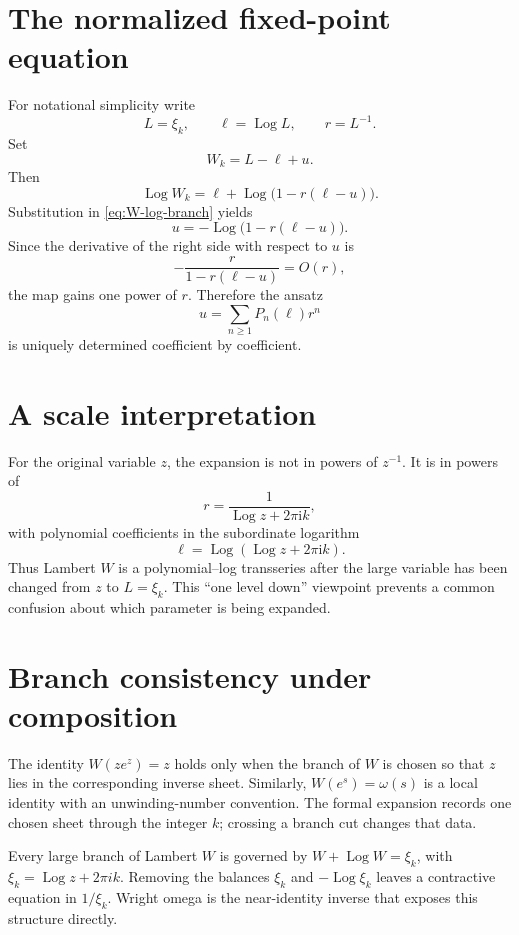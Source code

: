 \documentclass[11pt,openany]{book}
\theoremstyle{definition}
\theoremstyle{plain}
\theoremstyle{remark}
\newcommand{\ii}{\mathrm{i}}
\DeclareMathOperator{\Log}{Log}
\begin{document}
\section{The normalized fixed-point equation}
For notational simplicity write
\[
 L=\xi_k,
 \qquad \ell=\Log L,
 \qquad r=L^{-1}.
\]
Set
\begin{equation}\label{eq:W-normalized}
 W_k=L-\ell+u.
\end{equation}
Then
\[
 \Log W_k
 =\ell+\Log\bigl(1-r(\ell-u)\bigr).
\]
Substitution in \cref{eq:W-log-branch} yields
\begin{equation}\label{eq:W-fixed-point}
 u=-\Log\bigl(1-r(\ell-u)\bigr).
\end{equation}
Since the derivative of the right side with respect to \(u\) is
\begin{equation}\label{eq:W-contraction-factor}
 -\frac{r}{1-r(\ell-u)}=O(r),
\end{equation}
the map gains one power of \(r\). Therefore the ansatz
\begin{equation}\label{eq:W-Pn-ansatz}
 u=\sum_{n\ge1}P_n(\ell)r^n
\end{equation}
is uniquely determined coefficient by coefficient.

\section{A scale interpretation}
For the original variable \(z\), the expansion is not in powers of \(z^{-1}\). It is in powers of
\[
 r=\frac1{\Log z+2\pi\ii k},
\]
with polynomial coefficients in the subordinate logarithm
\[
 \ell=\Log(\Log z+2\pi\ii k).
\]
Thus Lambert \(W\) is a polynomial--log transseries after the large variable has been changed from \(z\) to \(L=\xi_k\). This ``one level down'' viewpoint prevents a common confusion about which parameter is being expanded.

\section{Branch consistency under composition}
The identity \(W(ze^z)=z\) holds only when the branch of \(W\) is chosen so that \(z\) lies in the corresponding inverse sheet. Similarly, \(W(e^s)=\omega(s)\) is a local identity with an unwinding-number convention. The formal expansion records one chosen sheet through the integer \(k\); crossing a branch cut changes that data.

\begin{summarybox}
Every large branch of Lambert \(W\) is governed by \(W+\Log W=\xi_k\), with \(\xi_k=\Log z+2\pi i k\). Removing the balances \(\xi_k\) and \(-\Log\xi_k\) leaves a contractive equation in \(1/\xi_k\). Wright omega is the near-identity inverse that exposes this structure directly.
\end{summarybox}
\end{document}
